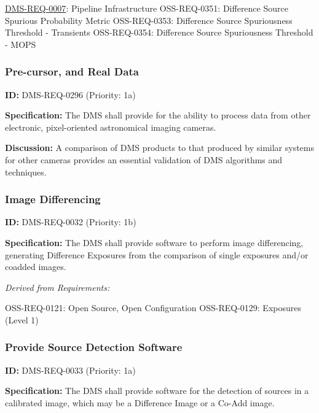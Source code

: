 \documentclass[SE,toc,lsstdraft]{lsstdoc}
\begin{document}
\hyperref[DMS-REQ-0007]{DMS-REQ-0007}:
Pipeline Infrastructure \newline
OSS-REQ-0351:
Difference Source Spurious Probability Metric \newline
OSS-REQ-0353:
Difference Source Spuriousness Threshold - Transients \newline
OSS-REQ-0354:
Difference Source Spuriousness Threshold - MOPS \newline

\subsubsection{Pre-cursor, and Real Data}

\label{DMS-REQ-0296}
\textbf{ID:} DMS-REQ-0296 (Priority: 1a)

\textbf{Specification:} The DMS shall provide for the ability to process data from other electronic, pixel-oriented astronomical imaging cameras.

\textbf{Discussion: }A comparison of DMS products to that produced by similar systems for other cameras provides an essential validation of DMS algorithms and techniques.

\subsubsection{Image Differencing}

\label{DMS-REQ-0032}
\textbf{ID:} DMS-REQ-0032 (Priority: 1b)

\textbf{Specification:} The DMS shall provide software to perform image differencing, generating Difference Exposures from the comparison of single exposures and/or coadded images.

\emph{Derived from Requirements:}

OSS-REQ-0121:
Open Source, Open Configuration \newline
OSS-REQ-0129:
Exposures (Level 1) \newline

\subsubsection{Provide Source Detection Software}

\label{DMS-REQ-0033}
\textbf{ID:} DMS-REQ-0033 (Priority: 1a)

\textbf{Specification:} The DMS shall provide software for the detection of sources in a calibrated image, which may be a Difference Image or a Co-Add image.
\end{document}
